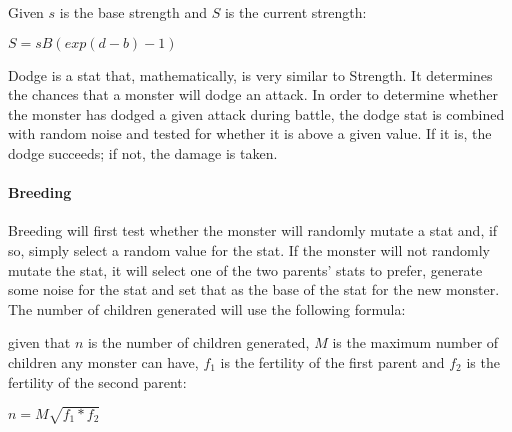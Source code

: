 Given \begin{math}s\end{math} is the base strength and \begin{math}S\end{math} is the current strength:

\begin{math}
S = sB(exp(d-b)-1)
\end{math}

Dodge is a stat that, mathematically, is very similar to Strength. It determines the chances that a monster will dodge an attack. In order to determine whether the monster has dodged a given attack during battle, the dodge stat is combined with random noise and tested for whether it is above a given value. If it is, the dodge succeeds; if not, the damage is taken.
\paragraph{Breeding} Breeding will first test whether the monster will randomly mutate a stat and, if so, simply select a random value for the stat. If the monster will not randomly mutate the stat, it will select one of the two parents' stats to prefer, generate some noise for the stat and set that as the base of the stat for the new monster. The number of children generated will use the following formula:

given that \begin{math}n\end{math} is the number of children generated, \begin{math}M\end{math} is the maximum number of children any monster can have, \begin{math}f_{1}\end{math} is the fertility of the first parent and \begin{math}f_{2}\end{math} is the fertility of the second parent:

\begin{math}
n = M\sqrt{f_{1} * f_{2}}
\end{math}
